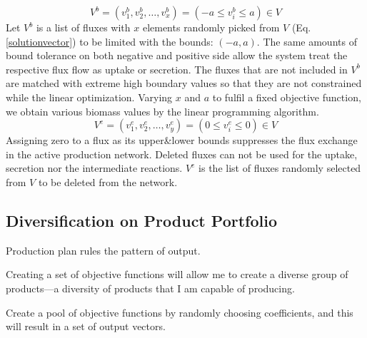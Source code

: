 \begin{equation} \tag{6}
	V^{b}=(v^{b}_{1}, v^{b}_{2},\dots, v^{b}_{x})= (-a\le v^{b}_{i}\le a)\in V
	\label{constrainedfluxlist}
\end{equation}
Let $V^{b}$ is a list of fluxes with $x$ elements randomly picked from $V$ (Eq.\eqref{solutionvector}) to be limited with the bounds: $(-a,a)$. The same amounts of bound tolerance on both negative and positive side allow the system treat the respective flux flow as uptake or secretion. The fluxes that are not included in $V^{b}$ are matched with extreme high boundary values so that they are not constrained while the linear optimization. Varying $x$ and $a$ to fulfil a fixed objective function, we obtain various biomass values by the linear programming algorithm.
\begin{equation} \tag{7}
	V^{e}=(v^{e}_{1}, v^{e}_{2},\dots, v^{e}_{y})= (0\le v^{e}_{i}\le 0)\in V
	\label{deletedreactions}
\end{equation}
Assigning zero to a flux as its upper\&lower bounds suppresses the flux exchange in the active production network. Deleted fluxes can not be used for the uptake, secretion nor the intermediate reactions. $V^{e}$ is the list of fluxes randomly selected from $V$ to be deleted from the network.

\subsection*{Diversification on Product Portfolio}
%
Production plan rules the pattern of output.

Creating a set of objective functions will allow me to create a diverse group of products—a diversity of products that I am capable of producing.

Create a pool of objective functions by randomly choosing coefficients, and this will result in a set of output vectors.
